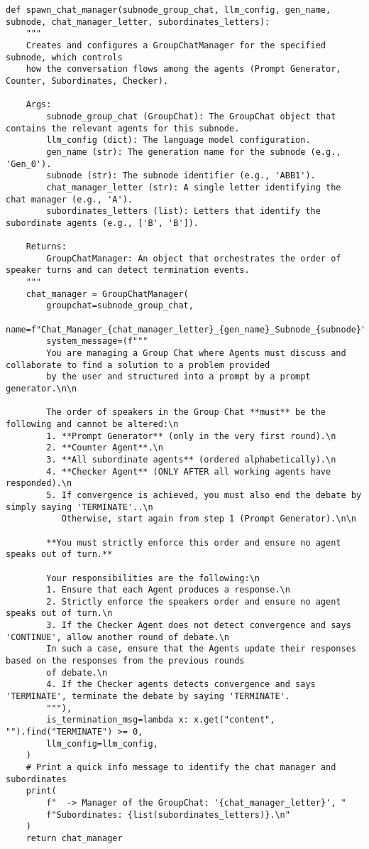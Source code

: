 \begin{lstlisting}
def spawn_chat_manager(subnode_group_chat, llm_config, gen_name, subnode, chat_manager_letter, subordinates_letters):
    """
    Creates and configures a GroupChatManager for the specified subnode, which controls
    how the conversation flows among the agents (Prompt Generator, Counter, Subordinates, Checker).

    Args:
        subnode_group_chat (GroupChat): The GroupChat object that contains the relevant agents for this subnode.
        llm_config (dict): The language model configuration.
        gen_name (str): The generation name for the subnode (e.g., 'Gen_0').
        subnode (str): The subnode identifier (e.g., 'ABB1').
        chat_manager_letter (str): A single letter identifying the chat manager (e.g., 'A').
        subordinates_letters (list): Letters that identify the subordinate agents (e.g., ['B', 'B']).

    Returns:
        GroupChatManager: An object that orchestrates the order of speaker turns and can detect termination events.
    """
    chat_manager = GroupChatManager(
        groupchat=subnode_group_chat,
        name=f"Chat_Manager_{chat_manager_letter}_{gen_name}_Subnode_{subnode}",
        system_message=(f"""
        You are managing a Group Chat where Agents must discuss and collaborate to find a solution to a problem provided 
        by the user and structured into a prompt by a prompt generator.\n\n

        The order of speakers in the Group Chat **must** be the following and cannot be altered:\n
        1. **Prompt Generator** (only in the very first round).\n
        2. **Counter Agent**.\n
        3. **All subordinate agents** (ordered alphabetically).\n
        4. **Checker Agent** (ONLY AFTER all working agents have responded).\n
        5. If convergence is achieved, you must also end the debate by simply saying 'TERMINATE'..\n
           Otherwise, start again from step 1 (Prompt Generator).\n\n

        **You must strictly enforce this order and ensure no agent speaks out of turn.**

        Your responsibilities are the following:\n
        1. Ensure that each Agent produces a response.\n
        2. Strictly enforce the speakers order and ensure no agent speaks out of turn.\n
        3. If the Checker Agent does not detect convergence and says 'CONTINUE', allow another round of debate.\n
        In such a case, ensure that the Agents update their responses based on the responses from the previous rounds 
        of debate.\n
        4. If the Checker agents detects convergence and says 'TERMINATE', terminate the debate by saying 'TERMINATE'.
        """),
        is_termination_msg=lambda x: x.get("content", "").find("TERMINATE") >= 0,
        llm_config=llm_config,
    )
    # Print a quick info message to identify the chat manager and subordinates
    print(
        f"  -> Manager of the GroupChat: '{chat_manager_letter}', "
        f"Subordinates: {list(subordinates_letters)}.\n"
    )
    return chat_manager



\end{lstlisting}
